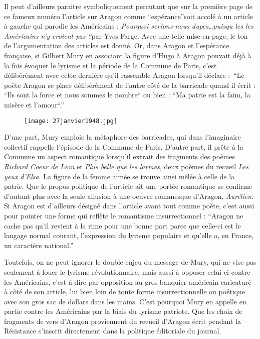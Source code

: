 Il peut d’ailleurs paraitre symboliquement percutant que sur la première page de ce fameux numéro l’article sur Aragon comme \enquote{espérance}soit accolé à un article à gauche qui parodie les Américains : \emph{Pourquoi serions-nous dupes…puisqu les les Américains n’y croient pas ?}par Yves Farge. Avec une telle mise-en-page, le ton de l’argumentation des articles est donné. Or, dans Aragon et l’espérance française, si Gilbert Mury en associant la figure d’Hugo à Aragon pouvait déjà à la fois évoquer le lyrisme et la période de la Commune de Paris, c’est délibérément avec cette dernière qu’il rassemble Aragon lorsqu’il déclare : \enquote{Le poète Aragon se place délibérément de l’autre côté de la barricade quand il écrit : “Ils sont la force et nous sommes le nombre“ ou bien : “Ma patrie est la faim, la misère et l’amour“.}


\begin{figure}[H]
   \centering
   \texttt{[image: 27janvier1948.jpg]}
	\caption{\cite{journallimbour}}\label{fig:}
\end{figure}


	D’une part, Mury emploie la métaphore des barricades, qui dans l’imaginaire collectif rappelle l’épisode de la Commune de Paris. D’autre part, il prête à la Commune un aspect romantique lorsqu’il extrait des fragments des poèmes \emph{Richard Coeur de Lion} et \emph{Plus belle que les larmes}, deux poèmes du recueil \emph{Les yeux d’Elsa}. La figure de la femme aimée se trouve ainsi mêlée à  celle de la patrie. Que le propos politique de l’article ait une portée romantique se confirme d’autant plus avec la seule allusion à une oeuvre romanesque d’Aragon, \emph{Aurélien}. Si Aragon est d’ailleurs désigné dans l’article avant tout comme poète, c’est aussi pour pointer une forme qui reflète le romantisme insurrectionnel : \enquote{Aragon ne cache pas qu’il revient à la rime pour une bonne part parce que celle-ci est le langage normal courant, l’expression du lyrisme populaire et qu’elle a, en France, un caractère national.}

	Toutefois, on ne peut ignorer le double enjeu du message de Mury, qui ne vise pas seulement à louer le lyrisme révolutionnaire, mais aussi à opposer celui-ci contre les Américains, c’est-à-dire par opposition au gros banquier américain caricaturé à côté de son article, lui bien loin de toute forme insurrectionnelle ou poétique avec son gros sac de dollars dans les mains. C’est pourquoi Mury en appelle en partie contre les Américains par la biais du lyrisme patriote. Que les choix de fragments de vers d’Aragon proviennent du recueil d’Aragon écrit pendant la Résistance s’inscrit directement dans la politique éditoriale du journal. 

